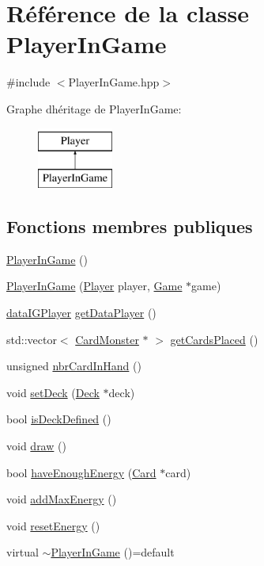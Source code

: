 \hypertarget{classPlayerInGame}{}\section{Référence de la classe Player\+In\+Game}
\label{classPlayerInGame}


{\ttfamily \#include $<$Player\+In\+Game.\+hpp$>$}

Graphe d\textquotesingle{}héritage de Player\+In\+Game\+:\begin{figure}[H]
\begin{center}
\leavevmode
\includegraphics[height=2.000000cm]{classPlayerInGame}
\end{center}
\end{figure}
\subsection*{Fonctions membres publiques}
\begin{DoxyCompactItemize}
\item 
\hyperlink{classPlayerInGame_aef3887730c6e58e3ffa4b8636f5a1fd4}{Player\+In\+Game} ()
\item 
\hyperlink{classPlayerInGame_a64e5c60c2e6106c9dda8c7d79fc36d8b}{Player\+In\+Game} (\hyperlink{classPlayer}{Player} player, \hyperlink{classGame}{Game} $\ast$game)
\item 
\hyperlink{structdataIGPlayer}{data\+I\+G\+Player} \hyperlink{classPlayerInGame_addeeee2e42cf2009fc21511624414146}{get\+Data\+Player} ()
\item 
std\+::vector$<$ \hyperlink{classCardMonster}{Card\+Monster} $\ast$ $>$ \hyperlink{classPlayerInGame_a519fc525decf5af1217b93749cd9ae99}{get\+Cards\+Placed} ()
\item 
unsigned \hyperlink{classPlayerInGame_a9f8df0a2ef00955f318b41149f57fcb7}{nbr\+Card\+In\+Hand} ()
\item 
void \hyperlink{classPlayerInGame_a399370210526407c4234d19815a5fa44}{set\+Deck} (\hyperlink{classDeck}{Deck} $\ast$deck)
\item 
bool \hyperlink{classPlayerInGame_af4d06834c260aebb66c113f397ba3c86}{is\+Deck\+Defined} ()
\item 
void \hyperlink{classPlayerInGame_a646d88b36595c2754ce33555b867c012}{draw} ()
\item 
bool \hyperlink{classPlayerInGame_ac1629d9cadf7445be42eb3245daef6c4}{have\+Enough\+Energy} (\hyperlink{classCard}{Card} $\ast$card)
\item 
void \hyperlink{classPlayerInGame_aedc8c0d75e0d249fde42329dc0a59557}{add\+Max\+Energy} ()
\item 
void \hyperlink{classPlayerInGame_ad18e833fa982d9db29521b49c74b1fa0}{reset\+Energy} ()
\item 
virtual \hyperlink{classPlayerInGame_a75256787f26b0d264a929e61889caba1}{$\sim$\+Player\+In\+Game} ()=default
\end{DoxyCompactItemize}
